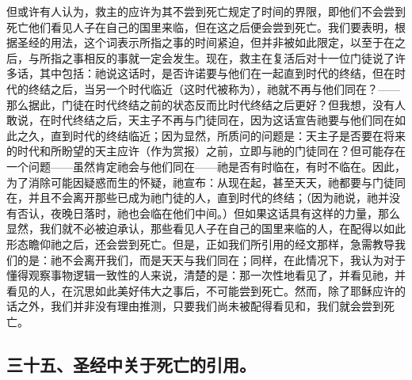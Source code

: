 但或许有人认为，救主的应许为其不尝到死亡规定了时间的界限，即他们不会尝到死亡他们看见人子在自己的国里来临，但在这之后便会尝到死亡。我们要表明，根据圣经的用法，这个词表示所指之事的时间紧迫，但并非被如此限定，以至于在之后，与所指之事相反的事就一定会发生。现在，救主在复活后对十一位门徒说了许多话，其中包括：祂说这话时，是否许诺要与他们在一起直到时代的终结，但在时代的终结之后，当另一个时代临近（这时代被称为），祂就不再与他们同在？——那么据此，门徒在时代终结之前的状态反而比时代终结之后更好？但我想，没有人敢说，在时代终结之后，天主子不再与门徒同在，因为这话宣告祂要与他们同在如此之久，直到时代的终结临近；因为显然，所质问的问题是：天主子是否要在将来的时代和所盼望的天主应许（作为赏报）之前，立即与祂的门徒同在？但可能存在一个问题——虽然肯定祂会与他们同在——祂是否有时临在，有时不临在。因此，为了消除可能因疑惑而生的怀疑，祂宣布：从现在起，甚至天天，祂都要与门徒同在，并且不会离开那些已成为祂门徒的人，直到时代的终结；（因为祂说，祂并没有否认，夜晚日落时，祂也会临在他们中间。）但如果这话具有这样的力量，那么显然，我们就不必被迫承认，那些看见人子在自己的国里来临的人，在配得以如此形态瞻仰祂之后，还会尝到死亡。但是，正如我们所引用的经文那样，急需教导我们的是：祂不会离开我们，而是天天与我们同在；同样，在此情况下，我认为对于懂得观察事物逻辑一致性的人来说，清楚的是：那一次性地看见了，并看见祂，并看见的人，在沉思如此美好伟大之事后，不可能尝到死亡。然而，除了耶稣应许的话之外，我们并非没有理由推测，只要我们尚未被配得看见和，我们就会尝到死亡。\par


\subsection{三十五、圣经中关于死亡的引用。}


